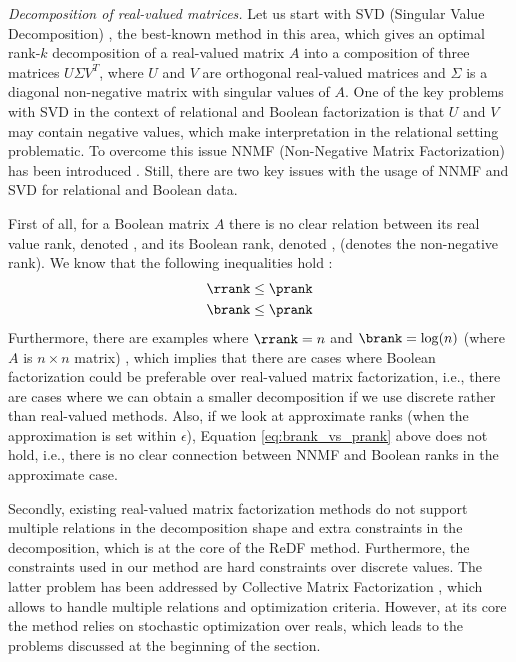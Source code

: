 \changesb
\textit{Decomposition of real-valued matrices.} Let us start with SVD (Singular Value Decomposition) \parencite{matrix_book}, the best-known method in this area, which gives an optimal rank-$k$ decomposition of a real-valued matrix $A$ into a composition of three matrices $U \Sigma V^T$, where $U$ and $V$ are orthogonal real-valued matrices and $\Sigma$ is a diagonal non-negative matrix with singular values of $A$. One of the key problems with SVD in the context of relational and Boolean factorization is that $U$ and $V$ may contain negative values, which make interpretation in the relational setting problematic. To overcome this issue NNMF (Non-Negative Matrix Factorization) has been introduced \parencite{nnmf}. Still, there are two key issues with the usage of NNMF and SVD for relational and Boolean data.

First of all, for a Boolean matrix $A$ there is no clear relation between its real value rank, denoted \rrank, and its Boolean rank, denoted \brank, (\prank denotes the non-negative rank). We know that the following inequalities hold \parencite{phd_miettinen}:
  \begin{align}
    &\rrank \leq \prank \nonumber \\
    &\brank \leq \prank \label{eq:brank_vs_prank}
  \end{align}
Furthermore, there are examples where $\rrank = n$ and $\brank = \log(n)$ (where $A$ is $n \times n$ matrix) \parencite{phd_miettinen}, which implies that there are cases where Boolean factorization could be preferable over real-valued matrix factorization, i.e., there are cases where we can obtain a smaller decomposition if we use discrete rather than real-valued methods. Also, if we look at approximate ranks (when the approximation is set within $\epsilon$), Equation \ref{eq:brank_vs_prank} above does not hold, i.e., there is no clear connection between NNMF and Boolean ranks in the approximate case.

Secondly, existing real-valued matrix factorization methods do not support multiple relations in the decomposition shape and extra constraints in the decomposition, which is at the core of the ReDF method. Furthermore, the constraints used in our method are hard constraints over discrete values.
The latter problem has been addressed by Collective Matrix Factorization \parencite{collective_factorization}, which allows to handle multiple relations and optimization criteria. However, at its core the method relies on stochastic optimization over reals, which leads to the problems discussed at the beginning of the section.

